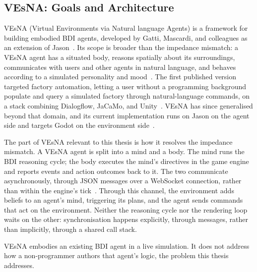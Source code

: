 \subsection{VEsNA: Goals and Architecture}
\label{sec:vesna-architecture}
 
VEsNA (Virtual Environments via Natural language Agents) is a framework for building embodied BDI agents, developed by Gatti, Mascardi, and colleagues as an extension of Jason~\cite{Gatti2026}. Its scope is broader than the impedance mismatch: a VEsNA agent has a situated body, reasons spatially about its surroundings, communicates with users and other agents in natural language, and behaves according to a simulated personality and mood~\cite{Gatti2026}. The first published version targeted factory automation, letting a user without a programming background populate and query a simulated factory through natural-language commands, on a stack combining Dialogflow, JaCaMo, and Unity~\cite{Gatti2023, Gatti2022}. VEsNA has since generalised beyond that domain, and its current implementation runs on Jason on the agent side and targets Godot on the environment side~\cite{Gatti2026, Ferrando2026}.
 
The part of VEsNA relevant to this thesis is how it resolves the impedance mismatch. A VEsNA agent is split into a mind and a body. The mind runs the BDI reasoning cycle; the body executes the mind's directives in the game engine and reports events and action outcomes back to it. The two communicate asynchronously, through JSON messages over a WebSocket connection, rather than within the engine's tick~\cite{Gatti2026}. Through this channel, the environment adds beliefs to an agent's mind, triggering its plans, and the agent sends commands that act on the environment. Neither the reasoning cycle nor the rendering loop waits on the other: synchronisation happens explicitly, through messages, rather than implicitly, through a shared call stack.
 
VEsNA embodies an existing BDI agent in a live simulation. It does not address how a non-programmer authors that agent's logic, the problem this thesis addresses.

